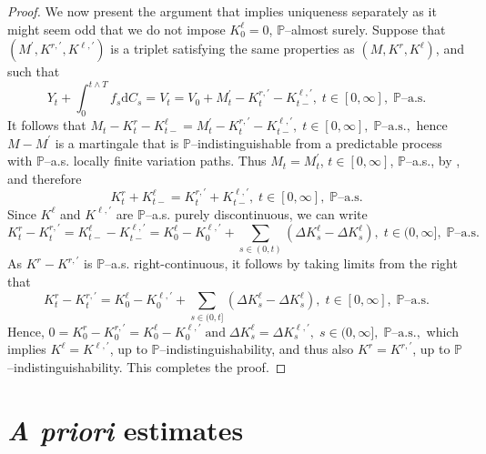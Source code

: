 \documentclass[10pt]{article} %
\def \P{\mathbb{P}}
\def\d{\mathrm{d}}
\begin{document}
\begin{proof}
	\medskip
	We now present the argument that implies uniqueness separately as it might seem odd that we do not impose $K^\ell_0 = 0$, $\P$--almost surely. Suppose that $(M^\prime,K^{r,\prime},K^{\ell,\prime})$ is a triplet satisfying the same properties as $(M,K^r,K^\ell)$, and such that
	\begin{equation*}
		Y_t + \int_0^{t \land T} f_s \d C_s = V_t = V_0 +M^\prime_t - K^{r,\prime}_t - K^{\ell,\prime}_{t-}, \; t \in [0,\infty], \; \text{$\P$--a.s.}
	\end{equation*}
	It follows that $M_t - K^r_t - K^\ell_{t-} = M^\prime_t - K^{r,\prime}_t - K^{\ell,\prime}_{t-}, \; t \in [0,\infty], \; \text{$\P$--a.s.},$ hence $M-M^\prime$ is a martingale that is $\P$--indistinguishable from a predictable process with $\P$--a.s. locally finite variation paths. Thus  $M_t = M^\prime_t$, $t \in [0,\infty]$, $\P$--a.s., by \cite[Corollary I.3.16]{jacod2003limit}, and therefore
	\begin{equation*}
		K^r_t + K^\ell_{t-} = K^{r,\prime}_t + K^{\ell,\prime}_{t-}, \; t \in [0,\infty], \; \text{$\P$--a.s.}
	\end{equation*}
	Since $K^\ell$ and $K^{\ell,\prime}$ are $\P$--a.s. purely discontinuous, we can write
	\begin{equation*}
		K^r_t - K^{r,\prime}_t = K^\ell_{t-} - K^{\ell,\prime}_{t-} = K^\ell_0 - K^{\ell,\prime}_0 + \sum_{s \in (0,t)} (\Delta K^\ell_s - \Delta K^\ell_s), \; t \in (0,\infty], \; \text{$\P$--a.s.}
	\end{equation*}
	As $K^r - K^{r,\prime}$ is $\P$--a.s. right-continuous, it follows by taking limits from the right that
	\begin{equation*}
		K^r_t - K^{r,\prime}_t = K^\ell_0 - K^{\ell,\prime}_0 + \sum_{s \in (0,t]} (\Delta K^\ell_s - \Delta K^\ell_s), \; t \in [0,\infty], \; \text{$\P$--a.s.}
	\end{equation*}
	Hence, $0 = K^r_0 - K^{r,\prime}_0 = K^\ell_0 - K^{\ell,\prime}_0 \; \text{and} \; \Delta K^\ell_s = \Delta K^{\ell,\prime}_s, \; s \in (0,\infty], \; \text{$\P$--a.s.},$ which implies $K^\ell = K^{\ell,\prime}$, up to $\P$--indistinguishability, and thus also $K^r = K^{r,\prime}$, up to $\P$--indistinguishability. This completes the proof.
\end{proof}


\section{\emph{A priori} estimates}\label{sec::a_priori}
\end{document}
